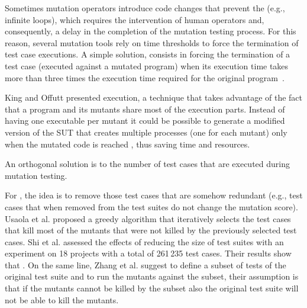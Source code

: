 
Sometimes mutation operators introduce code changes that prevent the  (e.g., infinite loops), which requires the intervention of human operators and, consequently, a delay in the completion of the mutation testing process.
For this reason, several mutation tools rely on time thresholds to force the termination of test case executions. 
A simple solution, consists in forcing the termination of a test case (executed against a mutated program) when its execution time  takes more than three times the execution time required for the original program~\cite{papadakis2019mutation}.

King and Offutt \cite{king1991fortran} presented  execution, a technique that takes advantage of the fact that a program and its mutants share most of the execution parts. Instead of having one executable per mutant it could be possible to generate a modified version of the SUT that creates multiple processes (one for each mutant) only when the mutated code is reached \cite{tokumoto2016muvm}, thus saving time and resources. 

An orthogonal solution is to  the number of test cases that are executed during mutation testing.

For , the idea is to remove those test cases that are somehow redundant (e.g., test cases that when removed from the test suites do not change the mutation score).
Usaola et al. \cite{usaola2012reduction} proposed a greedy algorithm that iteratively selects  the test cases that kill most of the mutants that were not killed by the previously selected test cases. 
Shi et al. \cite{shi2014balancing} assessed the effects of reducing the size of test suites with an experiment on 18 projects with a total of 261\,235 test cases. Their results show that . 
On the same line, Zhang et al. \cite{zhang2013faster} suggest to define a subset of tests of the original test suite and to run the mutants against the subset, their assumption is that if the mutants cannot be killed by the subset also the original test suite will not be able to kill the mutants.

